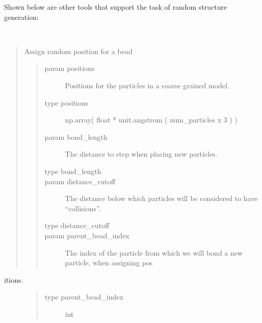 \documentclass[letterpaper,12pt,english,openany,oneside]{sphinxmanual}
\begin{document}
\newpage

Shown below are other tools that support the task of random structure generation:

\label{\detokenize{utilities:module-utilities.util}}

\begin{fulllineitems}
\label{\detokenize{utilities:utilities.util.assign_position}}~\begin{quote}

Assign random position for a bead
\begin{quote}\begin{description}
\item[{param positions}] \leavevmode
Positions for the particles in a coarse grained model.

\item[{type positions}] \leavevmode
np.array( float * unit.angstrom ( num\_particles x 3 ) )

\item[{param bond\_length}] \leavevmode
The distance to step when placing new particles.

\item[{type bond\_length}] \leavevmode
{}

\item[{param distance\_cutoff}] \leavevmode
The distance below which particles will be considered to have “collisions”.

\item[{type distance\_cutoff}] \leavevmode
{}

\item[{param parent\_bead\_index}] \leavevmode
The index of the particle from which we will bond a new particle, when assigning pos

\end{description}\end{quote}
\end{quote}
\begin{description}
\item[{itions.}] \leavevmode\begin{quote}\begin{description}
\item[{type parent\_bead\_index}] \leavevmode
int


\end{description}
\end{quote}
\end{description}
\end{fulllineitems}
\end{document}
